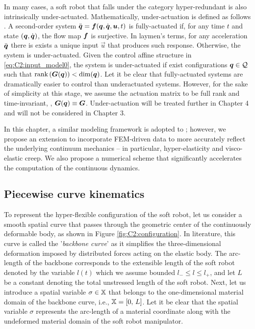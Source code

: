 \begin{asm}
In many cases, a soft robot that falls under the category hyper-redundant is also intrinsically under-actuated. Mathematically, under-actuation is defined as follows \cite{Russ2022}. A second-order system $\ddot{{\boldsymbol{q}}} = {\boldsymbol{f}}({\boldsymbol{q}},{\dot{\boldsymbol{q}}},{\boldsymbol{u}},t)$ is fully-actuated if, for any time $t$ and state $({\boldsymbol{q}},{\dot{\boldsymbol{q}}})$, the flow map ${\boldsymbol{f}}$ is surjective. In laymen's terms, for any acceleration $\ddot{{\boldsymbol{q}}}$ there is exists a unique input $\vec{u}$ that produces such response. Otherwise, the system is under-actuated. Given the control affine structure in \eqref{eq:C2:input_model0}, the system is under-actuated if exist configurations ${\boldsymbol{q}} \in \mathcal{Q}$
such that $\textnormal{rank} \left( \boldsymbol{G}({\boldsymbol{q}}) \right) < \text{dim}({\boldsymbol{q}})$.
Let it be clear that fully-actuated systems are dramatically easier to control than underactuated systems. However, for the sake of simplicity at this stage, we assume the actuation matrix to be full rank and time-invariant, \ie, $\boldsymbol{G}({\boldsymbol{q}}) \equiv \boldsymbol{G}$. Under-actuation will be treated further in Chapter 4 and will not be considered in Chapter 3.
\end{asm}

In this chapter, a similar modeling framework is adopted to \cite{Mochiyama2003}; however, we propose an extension to incorporate FEM-driven data to more accurately reflect the underlying continuum mechanics -- in particular, hyper-elasticity and visco-elastic creep. We also propose a numerical scheme that significantly accelerates the computation of the continuous dynamics.

\subsection{Piecewise curve kinematics}
\noindent To represent the hyper-flexible configuration of the soft robot, let us consider a smooth spatial curve that passes through the geometric center of the continuously deformable body, as shown in Figure \ref{fig:C2:configuration}. {In literature, this curve is called} the '\textit{backbone curve}' as it simplifies the three-dimensional deformation imposed by distributed forces acting on the elastic body. The arc-length of the backbone corresponds to the extensible length of the soft robot denoted by the variable $l(t)$ which we assume bounded ${l}_{-}\le l \le {l}_{+}$, and let $L$ be a constant denoting the {total unstressed} length of the soft robot. Next, let us introduce a spatial variable $\sigma \in \mathbb{X}$ that belongs to the one-dimensional material domain of the backbone curve, i.e., $\mathbb{X} = [0,\, L]$. Let it be clear that the spatial variable $\sigma$ represents the arc-length of a material coordinate along with the undeformed material domain of the soft robot manipulator.

